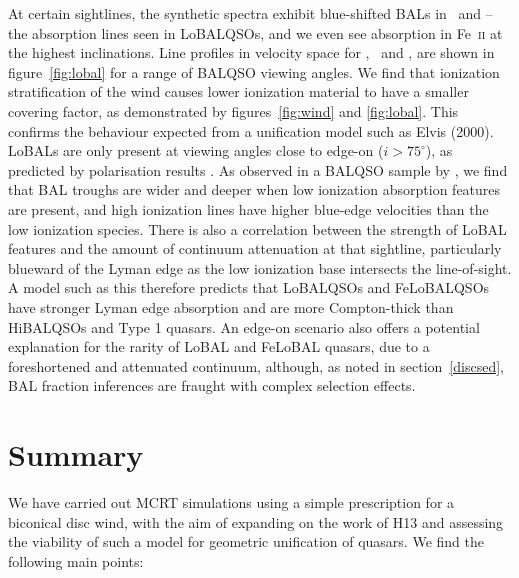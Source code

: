 \documentclass[useAMS,usenatbib]{mn2e_x}
\begin{document}
At certain sightlines, the synthetic spectra exhibit blue-shifted BALs in \al\ and \mg --
the absorption lines seen in LoBALQSOs, and we even see absorption in Fe~\textsc{ii}
at the highest inclinations. Line profiles in velocity space 
for \civ, \al\ and \mg, are shown in figure~\ref{fig:lobal} for a range
of BALQSO viewing angles. We find that ionization stratification
of the wind causes lower ionization material to have a smaller covering factor, 
as demonstrated by figures~\ref{fig:wind} and \ref{fig:lobal}.
This confirms the behaviour expected from a unification model such as Elvis (2000). 
LoBALs are only present at viewing angles close to edge-on ($i>75^\circ$),
as predicted by polarisation results \citep{brotherton1997}.
As observed in a BALQSO sample by \cite{filizak2014}, we find that
BAL troughs are wider and deeper when low ionization absorption features are present,
and high ionization lines have higher blue-edge velocities than the 
low ionization species.
There is also a correlation between the strength of LoBAL features
and the amount of continuum attenuation at that sightline, particularly
blueward of the Lyman edge as the low ionization base 
intersects the line-of-sight. 
A model such as this therefore predicts that LoBALQSOs and FeLoBALQSOs 
have stronger Lyman edge absorption and 
are more Compton-thick than HiBALQSOs and Type 1 quasars.
An edge-on scenario also offers a potential explanation for the rarity of LoBAL and
FeLoBAL quasars, due to a foreshortened and attenuated continuum, 
although, as noted in section~\ref{discsed}, BAL fraction 
inferences are fraught with complex selection effects.





\section{Summary}

We have carried out MCRT simulations using a simple
prescription for a biconical disc wind, with
the aim of expanding on the work of H13 and assessing 
the viability of such a model for geometric unification of quasars.
We find the following main points:
\end{document}
